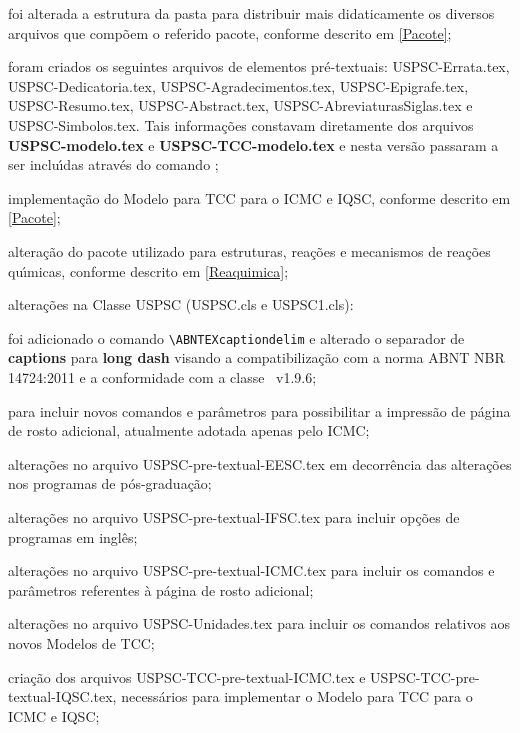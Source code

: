\begin{alineas}	 
	\item foi alterada a estrutura da pasta para distribuir mais didaticamente os diversos arquivos que comp\~oem o referido pacote, conforme descrito em \ref{Pacote}; 
	\item foram criados os seguintes arquivos de elementos pr\'e-textuais: USPSC-Errata.tex, USPSC-Dedicatoria.tex, USPSC-Agradecimentos.tex, USPSC-Epigrafe.tex,\\
	USPSC-Resumo.tex, USPSC-Abstract.tex, USPSC-AbreviaturasSiglas.tex e USPSC-Simbolos.tex. 
	Tais informa\c{c}\~oes constavam diretamente dos arquivos \textbf{USPSC-modelo.tex} e  \textbf{USPSC-TCC-modelo.tex} e nesta vers\~ao passaram a ser inclu\'{\i}das atrav\'es do comando \verb++;
	\item implementa\c{c}\~ao do Modelo para TCC para o ICMC e IQSC, conforme descrito em \ref{Pacote};
	\item altera\c{c}\~ao do pacote utilizado para estruturas, rea\c{c}\~oes e mecanismos de rea\c{c}\~oes qu\'{\i}micas, conforme descrito em \ref{Reaquimica};
	\item altera\c{c}\~oes na Classe USPSC (USPSC.cls e USPSC1.cls):
		\begin{subalineas}
			\item foi adicionado o comando \verb+\ABNTEXcaptiondelim+ e alterado o separador de \textbf{captions} para \textbf{long dash} visando a compatibiliza\c{c}\~ao com a norma  ABNT NBR 14724:2011 e a conformidade com a classe \abnTeX\ v1.9.6;
			\item para incluir novos comandos e par\^ametros para possibilitar a impress\~ao de p\'agina de rosto adicional, atualmente adotada apenas pelo ICMC;
		\end{subalineas}
	\item altera\c{c}\~oes no arquivo USPSC-pre-textual-EESC.tex em decorr\^encia das altera\c{c}\~oes nos programas de p\'os-gradua\c{c}\~ao;
	\item altera\c{c}\~oes no arquivo USPSC-pre-textual-IFSC.tex para incluir op\c{c}\~oes de programas em ingl\^es;
	\item altera\c{c}\~oes no arquivo USPSC-pre-textual-ICMC.tex para incluir os comandos e par\^ametros referentes \`a p\'agina de rosto adicional;
	\item altera\c{c}\~oes no arquivo USPSC-Unidades.tex para incluir os comandos relativos aos novos Modelos de TCC;
	\item cria\c{c}\~ao dos arquivos USPSC-TCC-pre-textual-ICMC.tex e USPSC-TCC-pre-textual-IQSC.tex, necess\'arios para implementar o Modelo para TCC para o ICMC e IQSC;

\end{alineas}
